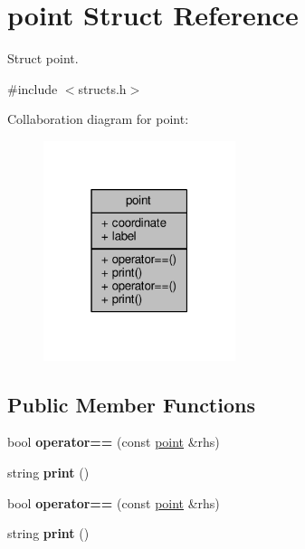 \hypertarget{structpoint}{}\section{point Struct Reference}
\label{structpoint}


Struct point.  




{\ttfamily \#include $<$structs.\+h$>$}



Collaboration diagram for point\+:
\nopagebreak
\begin{figure}[H]
\begin{center}
\leavevmode
\includegraphics[width=159pt]{structpoint__coll__graph}
\end{center}
\end{figure}
\subsection*{Public Member Functions}
\begin{DoxyCompactItemize}
\item 
bool {\bfseries operator==} (const \hyperlink{structpoint}{point} \&rhs)\hypertarget{structpoint_ab7d525ec6723f8960ae67505562cc49a}{}\label{structpoint_ab7d525ec6723f8960ae67505562cc49a}

\item 
string {\bfseries print} ()\hypertarget{structpoint_af90e6b5c7b1e845241e8e9a2cdf1b666}{}\label{structpoint_af90e6b5c7b1e845241e8e9a2cdf1b666}

\item 
bool {\bfseries operator==} (const \hyperlink{structpoint}{point} \&rhs)\hypertarget{structpoint_ab7d525ec6723f8960ae67505562cc49a}{}\label{structpoint_ab7d525ec6723f8960ae67505562cc49a}

\item 
string {\bfseries print} ()\hypertarget{structpoint_af90e6b5c7b1e845241e8e9a2cdf1b666}{}\label{structpoint_af90e6b5c7b1e845241e8e9a2cdf1b666}

\end{DoxyCompactItemize}
